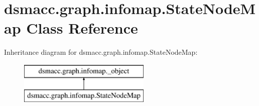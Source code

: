 \hypertarget{classdsmacc_1_1graph_1_1infomap_1_1StateNodeMap}{}\section{dsmacc.\+graph.\+infomap.\+State\+Node\+Map Class Reference}
\label{classdsmacc_1_1graph_1_1infomap_1_1StateNodeMap}
Inheritance diagram for dsmacc.\+graph.\+infomap.\+State\+Node\+Map\+:\begin{figure}[H]
\begin{center}
\leavevmode
\includegraphics[height=2.000000cm]{classdsmacc_1_1graph_1_1infomap_1_1StateNodeMap}
\end{center}
\end{figure}
